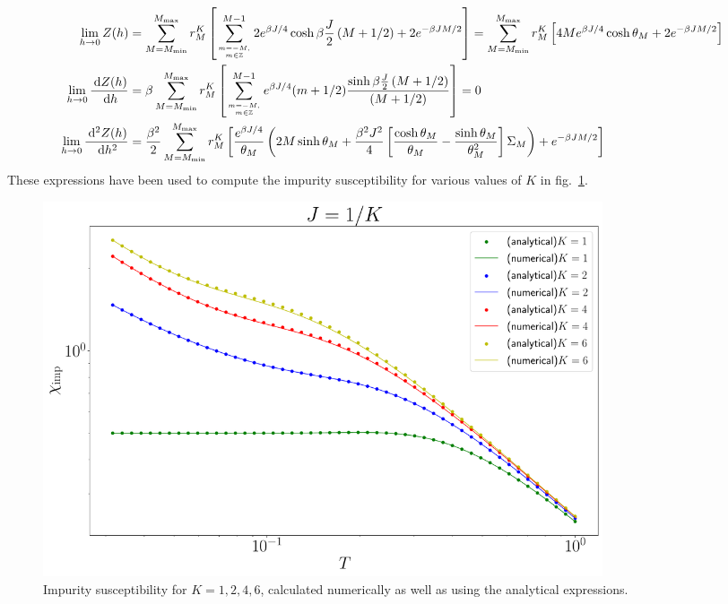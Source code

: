 \documentclass{revtex4-2}
\begin{document}
\begin{align}
	\lim_{h \to 0}Z(h) &= \sum_{M=M_\text{min}}^{M_\text{max}}r^K_M\left[\sum_{m=-M, \atop{m\in \mathbb{Z}}}^{M-1}2e^{\beta J/4}\cosh \beta \frac{J}{2}\left( M + 1/2 \right) + 2e^{-\beta JM/2}\right] = \sum_{M=M_\text{min}}^{M_\text{max}}r^K_M\left[4Me^{\beta J/4}\cosh \theta_M + 2e^{-\beta JM/2}\right]\\
	\lim_{h \to 0}\frac{\:\mathrm{d}Z(h)}{\:\mathrm{d}h} &=  \beta\sum_{M=M_\text{min}}^{M_\text{max}}r^K_M\left[\sum_{m=-M, \atop{m\in \mathbb{Z}}}^{M-1}e^{\beta J/4}(m+1/2)\frac{\sinh \beta\frac{J}{2}\left( M + 1/2 \right) }{\left( M + 1/2 \right)}\right] = 0\\
	\lim_{h \to 0}\frac{\:\mathrm{d}^2Z(h)}{\:\mathrm{d}h^2} &= \frac{\beta^2}{2}\sum_{M=M_\text{min}}^{M_\text{max}}r^K_M\left[\frac{e^{\beta J/4}}{\theta_M}\left(2M\sinh \theta_M + \frac{\beta^2 J^2}{4}\left[\frac{\cosh\theta_M}{\theta_M} - \frac{\sinh \theta_M}{\theta_M^2}\right]\Sigma_M\right)+ e^{-\beta JM/2}\right]\\
\end{align}
These expressions have been used to compute the impurity susceptibility for various values of \(K\) in fig.~\ref{chi_mchannel}.
\begin{figure}[htpb]
	\centering
	\includegraphics[width=0.8\textwidth]{../numerics/chi_mchannel.pdf}
	\caption{Impurity susceptibility for \(K=1,2,4,6\), calculated numerically as well as using the analytical expressions.}
	\label{chi_mchannel}
\end{figure}
\end{document}
